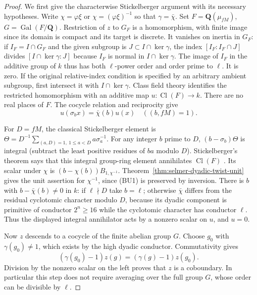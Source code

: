 \begin{proof}
We first give the characterwise Stickelberger argument
with its necessary hypotheses. Write $\chi=\varphi\xi$
or $\chi=(\varphi\xi)^{-1}$ so that $\gamma=\bar\chi$.
Set $F=\mathbf Q(\mu_{fM})$, $G=\operatorname{Gal}(F/\mathbf Q)$.
Restriction of $z$ to $G_F$ is a homomorphism, with
finite image since its domain is compact and its
target is discrete. It vanishes on inertia in $G_F$:
if $I_F=I\cap G_F$ and the given subgroup is
$J\subset I\cap\ker\gamma$, the index
$[I_F:I_F\cap J]$ divides $[I\cap\ker\gamma:J]$ because
$I_F$ is normal in $I\cap\ker\gamma$.
The image of $I_F$ in the additive group of $k$ thus
has both $\ell$-power order and order prime to $\ell$.
It is zero. If the original relative-index condition
is specified by an arbitrary ambient subgroup, first
intersect it with $I\cap\ker\gamma$.
Class field theory identifies the restricted homomorphism
with an additive map $u:\operatorname{Cl}(F)\to k$.
There are no real places of $F$. The cocycle relation
and reciprocity give
\[
                  u(\sigma_b x)=\bar\chi(b)u(x)
       \quad ((b,fM)=1).
\]

For $D=fM$, the classical Stickelberger element is
$\Theta=D^{-1}\sum_{(a,D)=1,\ 1\le a<D}a\sigma_a^{-1}$.
For any integer $b$ prime to $D$, $(b-\sigma_b)\Theta$
is integral (subtract the least positive residues of
$ba$ modulo $D$). Stickelberger's theorem says that
this integral group-ring element annihilates
$\operatorname{Cl}(F)$ \cite[Theorem 4.5.6]{dyadic-bernoulli-sharifi}.
Its scalar under $\chi$ is
$(b-\chi(b))B_{1,\chi^{-1}}$.
Theorem~\ref{thm:selmer-dyadic-twist-unit} gives the
unit assertion for $\chi^{-1}$, since (BU1) is preserved
by inversion. There is $b$ with $b-\bar\chi(b)\ne0$
in $k$: if $\ell\nmid D$ take $b=\ell$; otherwise
$\bar\chi$ differs from the residual cyclotomic
character modulo $D$, because its dyadic component
is primitive of conductor $2^n\ge16$ while the
cyclotomic character has conductor $\ell$.
Thus the displayed integral annihilator acts by a
nonzero scalar on $u$, and $u=0$.

Now $z$ descends to a cocycle of the finite abelian
group $G$. Choose $g_0$ with $\gamma(g_0)\ne1$,
which exists by the high dyadic conductor.
Commutativity gives
\[
 (\gamma(g_0)-1)z(g)=(\gamma(g)-1)z(g_0).
\]
Division by the nonzero scalar on the left proves
that $z$ is a coboundary. In particular this step
does not require averaging over the full group $G$,
whose order can be divisible by $\ell$.
\end{proof}

